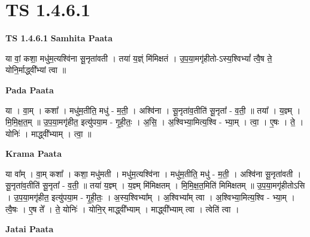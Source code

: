 \documentclass[17pt]{extarticle}
\begin{document}
\section{ TS 1.4.6.1 }

\textbf{TS 1.4.6.1 } \newline
\textbf{Samhita Paata} \newline

या वां॒ कशा॒ मधु॑म॒त्यश्वि॑ना सू॒नृता॑वती । तया॑ य॒ज्ञ्ं मि॑मिक्षतं । उ॒प॒या॒मगृ॑हीतो-ऽस्य॒श्विभ्यां᳚ त्वै॒ष ते॒ योनि॒र्माद्ध्वी᳚भ्यां त्वा ॥ \newline

\textbf{Pada Paata} \newline

या । वा॒म् । कशा᳚ । मधु॑म॒तीति॒ मधु॑ - म॒ती॒ । अश्वि॑ना । सू॒नृता॑व॒तीति॑ सू॒नृता᳚ - व॒ती॒ ॥ तया᳚ । य॒ज्ञ्म् । मि॒मि॒क्ष॒त॒म् ॥ उ॒प॒या॒मगृ॑हीत॒ इत्यु॑पया॒म - गृ॒ही॒तः॒ । अ॒सि॒ । अ॒श्विभ्या॒मित्य॒श्वि - भ्या॒म् । त्वा॒ । ए॒षः । ते॒ । योनिः॑ । माद्ध्वी᳚भ्याम् । त्वा॒ ॥  \newline


\textbf{Krama Paata} \newline

या वा᳚म् । वा॒म् कशा᳚ । कशा॒ मधु॑मती । मधु॑म॒त्यश्वि॑ना । मधु॑म॒तीति॒ मधु॑ - म॒ती॒ । अश्वि॑ना सू॒नृता॑वती । सू॒नृता॑व॒तीति॑ सू॒नृता᳚ - व॒ती॒ ॥ तया॑ य॒ज्ञ्म् । य॒ज्ञ्म् मि॑मिक्षतम् । मि॒मि॒क्ष॒त॒मिति॑ मिमिक्षतम् ॥ उ॒प॒या॒मगृ॑हीतोऽसि । उ॒प॒या॒मगृ॑हीत॒ इत्यु॑पया॒म - गृ॒ही॒तः॒ । अ॒स्य॒श्विभ्या᳚म् । अ॒श्विभ्या᳚म् त्वा । अ॒श्विभ्या॒मित्य॒श्वि - भ्या॒म् । त्वै॒षः । ए॒ष ते᳚ । ते॒ योनिः॑ । योनि॒र् माद्ध्वी᳚भ्याम् । माद्ध्वी᳚भ्याम् त्वा । त्वेति॑ त्वा । \newline

\textbf{Jatai Paata} \newline
\end{document}
